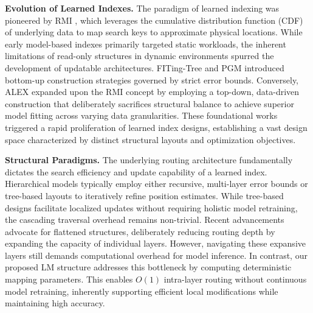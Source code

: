 
\textbf{Evolution of Learned Indexes.}
The paradigm of learned indexing was pioneered by RMI \cite{case18}, which leverages the cumulative distribution function (CDF) of underlying data to map search keys to approximate physical locations. While early model-based indexes \cite{radixspline20, plex21, shift21} primarily targeted static workloads, the inherent limitations of read-only structures in dynamic environments spurred the development of updatable architectures. FITing-Tree \cite{fiting-tree19} and PGM \cite{pgm20} introduced bottom-up construction strategies governed by strict error bounds. Conversely, ALEX \cite{alex20} expanded upon the RMI concept by employing a top-down, data-driven construction that deliberately sacrifices structural balance to achieve superior model fitting across varying data granularities. These foundational works triggered a rapid proliferation of learned index designs, establishing a vast design space characterized by distinct structural layouts and optimization objectives.

\textbf{Structural Paradigms.}
The underlying routing architecture fundamentally dictates the search efficiency and update capability of a learned index. Hierarchical models typically employ either recursive, multi-layer error bounds \cite{case18, pgm20} or tree-based layouts \cite{alex20, lipp21} to iteratively refine position estimates. While tree-based designs facilitate localized updates without requiring holistic model retraining, the cascading traversal overhead remains non-trivial. Recent advancements \cite{uplif25, swix24, cabin24} advocate for flattened structures, deliberately reducing routing depth by expanding the capacity of individual layers. However, navigating these expansive layers still demands computational overhead for model inference. In contrast, our proposed LM structure addresses this bottleneck by computing deterministic mapping parameters. This enables $O(1)$ intra-layer routing without continuous model retraining, inherently supporting efficient local modifications while maintaining high accuracy.

